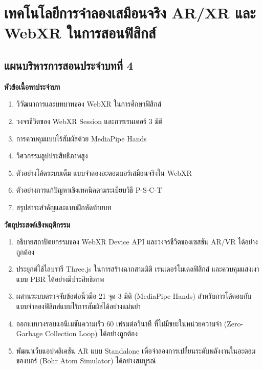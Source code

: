 \chapter{เทคโนโลยีการจำลองเสมือนจริง AR/XR และ WebXR ในการสอนฟิสิกส์}
\label{chap:ar_xr_frameworks}

\section*{แผนบริหารการสอนประจำบทที่ 4}

\noindent\textbf{หัวข้อเนื้อหาประจำบท}
\begin{enumerate}
    \item วิวัฒนาการและบทบาทของ WebXR ในการศึกษาฟิสิกส์
    \item วงจรชีวิตของ WebXR Session และการเรนเดอร์ 3 มิติ
    \item การควบคุมแบบไร้สัมผัสด้วย MediaPipe Hands
    \item วิศวกรรมลูปประสิทธิภาพสูง
    \item ตัวอย่างโค้ดระบบเต็ม แบบจำลองอะตอมบอร์เสมือนจริงใน WebXR
    \item ตัวอย่างการแก้ปัญหาเชิงเทคนิคตามระเบียบวิธี P-S-C-T
    \item สรุปสาระสำคัญและแบบฝึกหัดท้ายบท
\end{enumerate}

\noindent\textbf{วัตถุประสงค์เชิงพฤติกรรม}
\begin{enumerate}
    \item อธิบายสถาปัตยกรรมของ WebXR Device API และวงจรชีวิตของเซสชัน AR/VR ได้อย่างถูกต้อง
    \item ประยุกต์ใช้ไลบรารี Three.js ในการสร้างฉากสามมิติ เรนเดอร์โมเดลฟิสิกส์ และควบคุมแสงเงาแบบ PBR ได้อย่างมีประสิทธิภาพ
    \item ผสานระบบตรวจจับข้อต่อนิ้วมือ 21 จุด 3 มิติ (MediaPipe Hands) สำหรับการโต้ตอบกับแบบจำลองฟิสิกส์แบบไร้การสัมผัสได้อย่างแม่นยำ
    \item ออกแบบวงรอบแอนิเมชันความเร็ว 60 เฟรมต่อวินาที ที่ไม่มีขยะในหน่วยความจำ (Zero-Garbage Collection Loop) ได้อย่างถูกต้อง
    \item พัฒนาเว็บแอปพลิเคชัน AR แบบ Standalone เพื่อจำลองการเปลี่ยนระดับพลังงานในอะตอมของบอร์ (Bohr Atom Simulator) ได้อย่างสมบูรณ์
\end{enumerate}

